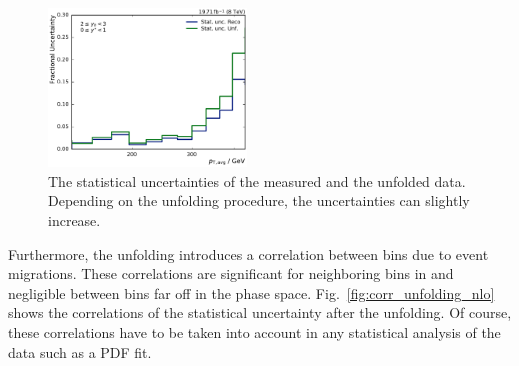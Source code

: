 \begin{figure}[htbp]
    \includegraphics[width=0.47\textwidth]{figures/measurement/statunc_fractional_yb2ys0.pdf}
    \caption[Statistical uncertainty of measured and unfolded spectrum]{The
    statistical uncertainties of the measured and the unfolded data. Depending
    on the unfolding procedure, the uncertainties can slightly increase.}
    \label{fig:statunc_relative}
\end{figure}

Furthermore, the unfolding introduces a correlation between bins due to event
migrations. These correlations are significant for neighboring bins in \pt and
negligible between bins far off in the phase space.
Fig.~\ref{fig:corr_unfolding_nlo} shows the correlations of the statistical
uncertainty after the unfolding. Of course, these correlations have to be taken
into account in any statistical analysis of the data such as a PDF fit.


